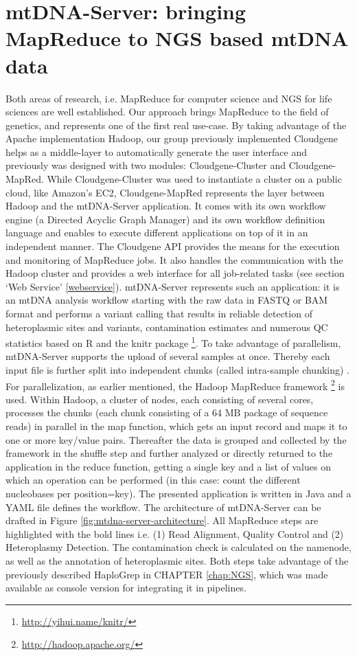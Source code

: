 \section{mtDNA-Server: bringing MapReduce to NGS based mtDNA data}
Both areas of research, i.e. MapReduce for computer science and NGS for life sciences are well established. Our approach brings MapReduce to the field of genetics, and represents one of the first real use-case. By taking advantage of the Apache implementation Hadoop\cite{White2009}, our group previously implemented Cloudgene\cite{Schonherr2012} helps as a middle-layer to automatically generate the user interface and previously was designed with two modules: Cloudgene-Cluster and Cloudgene-MapRed. While Cloudgene-Cluster was used to instantiate a cluster on a public cloud, like Amazon's EC2, Cloudgene-MapRed represents the layer between Hadoop and the mtDNA-Server application. It comes with its own workflow engine (a Directed Acyclic Graph Manager) and its own workflow definition language and enables to execute different applications on top of it in an independent manner. The Cloudgene API provides the means for the execution and monitoring of MapReduce jobs. It also handles the communication with the Hadoop cluster and provides a web interface for all job-related tasks  \cite{Weissensteiner2016b} (see section ‘Web Service’ \ref{webservice}).
mtDNA-Server represents such an application: it is an mtDNA analysis workflow starting with the raw data in FASTQ or BAM format and performs a variant calling that results in reliable detection of heteroplasmic sites and variants, contamination estimates and numerous QC statistics based on R \cite{R} and the knitr package \footnote{\url{http://yihui.name/knitr/}}. To take advantage of parallelism, mtDNA-Server supports the upload of several samples at once. Thereby each input file is further split into independent chunks (called intra-sample chunking) \cite{Weissensteiner2016b}. For parallelization, as earlier mentioned, the Hadoop MapReduce framework \footnote{\url{http://hadoop.apache.org/}} is used. Within Hadoop, a cluster of nodes, each consisting of several cores, processes the chunks (each chunk consisting of a 64 MB package of sequence reads) in parallel in the map function, which gets an input record and maps it to one or more key/value pairs. Thereafter the data is grouped and collected by the framework in the shuffle step and further analyzed or directly returned to the application in the reduce function, getting a single key and a list of values on which an operation can be performed (in this case: count the different nucleobases per position=key). The presented application is written in Java and a YAML file defines the workflow. The architecture of mtDNA-Server can be drafted in Figure \ref{fig:mtdna-server-architecture}. All MapReduce steps are highlighted with the bold lines i.e. (1) Read Alignment, Quality Control and (2) Heteroplasmy Detection. The contamination check is calculated on the namenode, as well as the annotation of heteroplasmic sites. Both steps take advantage of the previously described HaploGrep in CHAPTER \ref{chap:NGS}, which was made available as console version for integrating it in pipelines. 

